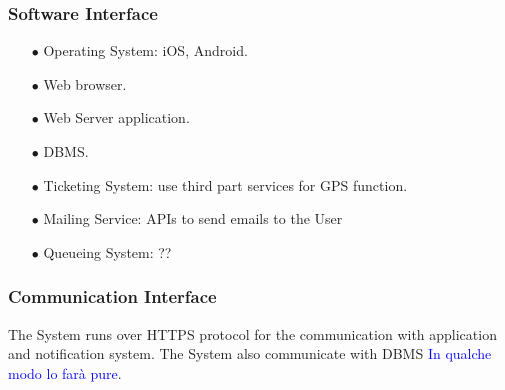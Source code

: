 \documentclass[a4paper, 10pt, oneside]{article}
\newcommand{\giovanni}[1]{\textcolor{Blue}{#1}}
\begin{document}
\subsubsection{Software Interface}
\begin{enumerate}
\item[$\bullet$] Operating System: iOS, Android.
\item[$\bullet$] Web browser.
\item[$\bullet$] Web Server application.
\item[$\bullet$] DBMS.
\item[$\bullet$] Ticketing System: use third part services for GPS function. 
\item[$\bullet$] Mailing Service: APIs to send emails to the User
\item[$\bullet$] Queueing System: ??
\end{enumerate}

\subsubsection{Communication Interface}
The System runs over HTTPS protocol for the communication with application and notification system. The System also communicate with DBMS \giovanni{In qualche modo lo farà pure}.
\end{document}
